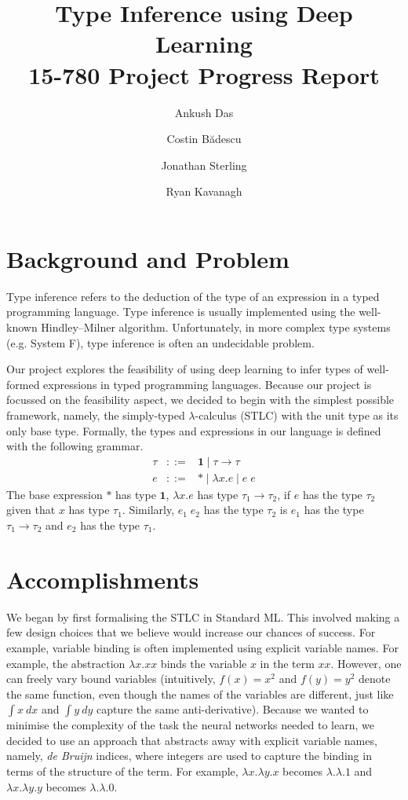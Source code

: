 \documentclass{amsart}
\title{Type Inference using Deep Learning\\15-780 Project Progress Report}
\author{Ankush Das}
\author{Costin B\u{a}descu}
\author{Jonathan Sterling}
\author{Ryan Kavanagh}
\begin{document}
\maketitle

\section{Background and Problem}
Type inference refers to the deduction of the type of an expression in a
typed programming language. Type inference is usually implemented
using the well-known Hindley--Milner algorithm.
Unfortunately, in more complex type systems (e.g. System
F), type inference is often an undecidable
problem.

Our project explores the feasibility of using deep learning to infer
types of well-formed expressions in typed programming
languages. Because our project is focussed on the feasibility aspect,
we decided to begin with the simplest possible framework, namely, the
simply-typed $\lambda$-calculus (STLC) with the unit type as its only
base type. Formally, the types and expressions in our language is
defined with the following grammar.
\begin{eqnarray*}
\tau & ::= & \mathbf{1} \mid \tau \to \tau \\
e & ::= & * \mid \lambda x. e \mid e \; e
\end{eqnarray*}
The base expression $*$ has type $\mathbf{1}$, $\lambda x. e$ has type
$\tau_1 \to \tau_2$, if $e$ has the type $\tau_2$ given that $x$ has type
$\tau_1$. Similarly, $e_1 \; e_2$ has the type $\tau_2$ is $e_1$ has the
type $\tau_1 \to \tau_2$ and $e_2$ has the type $\tau_1$.

\section{Accomplishments}

We began by first formalising the STLC in Standard ML. This involved
making a few design choices that we believe would increase our chances
of success. For example, variable binding is often implemented using
explicit variable names. For example, the abstraction $\lambda x. xx$
binds the variable $x$ in the term $xx$. However, one can freely vary
bound variables (intuitively, $f(x) = x^2$ and $f(y) = y^2$ denote the
same function, even though the names of the variables are different,
just like $\int x\ dx$ and $\int y\ dy$ capture the same
anti-derivative). Because we wanted to minimise the complexity of the
task the neural networks needed to learn, we decided to use an
approach that abstracts away with explicit variable names, namely,
\textit{de Bruijn} indices, where integers are used to capture the
binding in terms of the structure of the term. For example,
$\lambda x.\lambda y.x$ becomes $\lambda.\lambda.1$ and
$\lambda x.\lambda y.y$ becomes $\lambda . \lambda . 0$.
\end{document}
